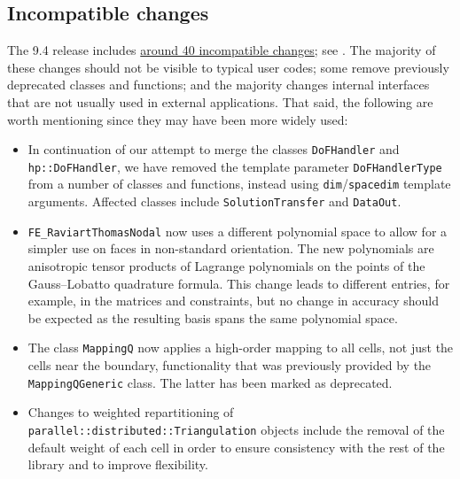 \documentclass{ansarticle-preprint}
\begin{document}
\subsection{Incompatible changes}\label{subsec:deprecated}

The 9.4 release includes
\href{https://dealii.org/developer/doxygen/deal.II/changes_between_9_3_0_and_9_4_0.html}
{around 40 incompatible changes}; see \cite{changes94}. The majority of these changes
should not be visible to typical user codes; some remove previously
deprecated classes and functions; and the majority changes internal
interfaces that are not usually used in external
applications. That said, the following are worth mentioning since they
may have been more widely used:
\begin{itemize}
  \item In continuation of our attempt to merge the classes \texttt{DoFHandler} and \texttt{hp::DoFHandler}, we have removed the
  template parameter \texttt{DoFHandlerType} from a number of classes and
  functions, instead using \texttt{dim}/\texttt{spacedim} template arguments. Affected
  classes include \texttt{SolutionTransfer} and \texttt{DataOut}.
  \item \texttt{FE\_RaviartThomasNodal} now uses a different polynomial space to allow
  for a simpler use on faces in non-standard orientation. The new polynomials
  are anisotropic tensor products of Lagrange polynomials on the points of the
  Gauss--Lobatto quadrature formula. This change leads to different entries, for example, in
  the matrices and constraints, but no change in accuracy should be expected as
  the resulting basis spans the same polynomial space.
  \item The class \texttt{MappingQ} now applies a high-order mapping
    to all cells, not just the cells near the boundary, functionality
    that was previously provided by the \texttt{MappingQGeneric}
    class. The latter has been marked as deprecated.
  \item Changes to weighted repartitioning of
    \texttt{parallel::distributed::Triangulation} objects include
  the removal of the default weight of each cell in order to ensure
  consistency with the rest of the library and to improve flexibility.
\end{itemize}



\end{document}
